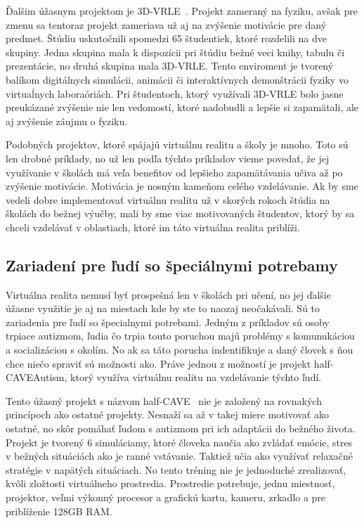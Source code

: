 \documentclass[10pt,twoside,slovak,a4paper]{article}
\begin{document}
Ďalšim úžasnym projektom je 3D-VRLE~\cite{Physics}. Projekt zameraný na fyziku, avšak pre zmenu sa tentoraz projekt zameriava už aj na zvýšenie motivácie pre daný predmet. Štúdiu uskutočnili spomedzi 65 študentiek, ktoré rozdelili na dve skupiny. Jedna skupina mala k dispozícii pri štúdiu bežné veci knihy, tabulu či prezentácie, no druhá skupina mala 3D-VRLE. Tento enviroment je tvorený balíkom digitálnych simulácii, animácii či interaktívnych demonštrácii fyziky vo virtuaĺnych laboraóriách. Pri študentoch, ktorý využívali 3D-VRLE bolo jasne preukázané zvýšenie nie len vedomostí, ktoré nadobudli a lepšie si zapamätali, ale aj zvýšenie záujmu o fyziku.

Podobných projektov, ktoré spájajú virtuálnu realitu a školy je mnoho. Toto sú len drobné príklady, no už len podľa týchto príkladov vieme povedať, že jej využívanie v školách má veľa benefitov od lepšieho zapamätávania učiva až po zvýšenie motivácie. Motivácia je nosným kameňom celého vzdelávanie. Ak by sme vedeli dobre implementovať virtuálnu realitu už v skorých rokoch štúdia na školách do bežnej výučby, mali by sme viac motivovaných študentov, ktorý by sa chceli vzdelávať v oblastiach, ktoré im táto virtuálna realita priblíži.  


\subsection{Zariadení pre ľudí so špeciálnymi potrebamy} \label{školy:zariadenia}
Virtuálna realita nemusí byť prospešná len v školách pri učení, no jej ďalšie úžasne využitie je aj na miestach kde by ste to naozaj neočakávali. Sú to zariadenia pre ľudí so špecialnymi potrebami. Jedným z príkladov sú osoby trpiace autizmom, ľudia čo trpia touto poruchou majú problémy s komunukáciou a socializáciou s okolím. No ak sa táto porucha indentifikuje a daný človek s ňou chce niečo spraviť sú možnosti ako. Práve jednou z možností je projekt half-CAVEAutism, ktorý využíva virtuálnu realitu na vzdelávanie týchto ľudí.

Tento úžasný projekt s názvom half-CAVE~\cite{Autism} nie je založený na rovnakých princípoch ako ostatné projekty. Nesnaží sa až v takej miere motivovať ako ostatné, no skôr pomáhať ľudom s autizmom pri ich adaptácii do bežného života. Projekt je tvorený 6 simuláciamy, ktoré človeka naučia ako zvládať emócie, stres v bežných situáciách ako je ranné vstávanie. Taktiež učia ako využívať relaxačné stratégie v napätých situáciach. No tento tréning nie je jednoduché zrealizovať, kvôli zložtosti virtuálneho prostredia. Prostredie potrebuje, jednu miestnosť, projektor, veľmi výkonný procesor a grafickú kartu, kameru, zrkadlo a pre priblíženie 128GB RAM. 
\end{document}
